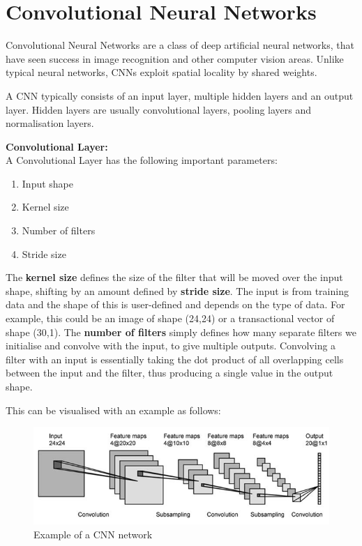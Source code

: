 \documentclass[12pt,a4paper,twoside]{report}
\begin{document}
\section{Convolutional Neural Networks}
Convolutional Neural Networks\cite{DBLP:journals/corr/SimonyanZ14a} are a class of deep artificial neural networks, that have seen success in image recognition and other computer vision areas. Unlike typical neural networks, CNNs exploit spatial locality by shared weights. 

A CNN typically consists of an input layer, multiple hidden layers and an output layer. Hidden layers are usually convolutional layers, pooling layers and normalisation layers. 

\textbf{Convolutional Layer:}\\
A Convolutional Layer has the following important parameters: 
\begin{enumerate}
  \item Input shape
  \item Kernel size
  \item Number of filters
  \item Stride size
\end{enumerate}

The \textbf{kernel size} defines the size of the filter that will be moved over the input shape, shifting by an amount defined by \textbf{stride size}. The input is from training data and the shape of this is user-defined and depends on the type of data. For example, this could be an image of shape (24,24) or a transactional vector of shape (30,1). The \textbf{number of filters} simply defines how many separate filters we initialise and convolve with the input, to give multiple outputs. Convolving a filter with an input is essentially taking the dot product of all overlapping cells between the input and the filter, thus producing a single value in the output shape. 

This can be visualised with an example as follows:\\

\begin{figure}[H]

\centering
\includegraphics[width=\textwidth]{CNN-Example}
\caption{Example of a CNN network}
\end{figure}
\end{document}
